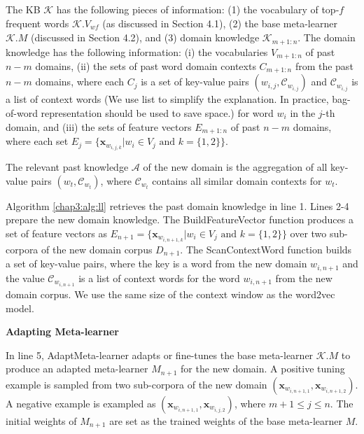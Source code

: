The KB $\mathcal{K}$ has the following pieces of information:
(1) the vocabulary of top-$f$ frequent words $\mathcal{K}.V_{\textit{wf}}$ (as discussed in Section 4.1), 
(2) the base meta-learner $\mathcal{K}.M$ (discussed in Section 4.2),
and (3) domain knowledge $\mathcal{K}_{m+1:n}$.
The domain knowledge has the following information:
(i) the vocabularies $V_{m+1:n}$ of past $n-m$ domains,
(ii) the sets of past word domain contexts $C_{m+1:n}$ from the past $n-m$ domains, where each $C_j$ is a set of key-value pairs $(w_{i,j}, \mathcal{C}_{w_{i,j} } )$ and $\mathcal{C}_{w_{i,j} } $ is a list of context words (We use list to simplify the explanation. In practice, bag-of-word representation should be used to save space.) for word $w_i$ in the $j$-th domain, 
and (iii) the sets of feature vectors $E_{m+1:n}$ of past $n-m$ domains, where each set $E_{j}=\{ \mathbf{x}_{w_{i, j, k}} | w_i \in V_{j} \text{ and } k=\{1, 2\} \}$.

The relevant past knowledge $\mathcal{A}$ of the new domain is the aggregation of all key-value pairs $(w_t, \mathcal{C}_{w_t})$, where $\mathcal{C}_{w_t}$ contains all similar domain contexts for $w_t$.

Algorithm \ref{chap3:alg:ll} retrieves the past domain knowledge in line 1.
Lines 2-4 prepare the new domain knowledge.
The BuildFeatureVector function produces a set of feature vectors as $E_{n+1}=\{ \mathbf{x}_{w_{i, n+1, k}} | w_i \in V_{j} \text{ and } k=\{1, 2\}\}$ over two sub-corpora of the new domain corpus $D_{n+1}$.
The ScanContextWord function builds a set of key-value pairs, where the key is a word from the new domain $w_{i, n+1}$ and the value $\mathcal{C}_{w_{i,n+1} } $ is a list of context words for the word $w_{i, n+1}$ from the new domain corpus. We use the same size of the context window as the word2vec model.

\textbf{Adapting Meta-learner}

In line 5, AdaptMeta-learner adapts or fine-tunes the base meta-learner $\mathcal{K}.M$ to produce an adapted meta-learner $M_{n+1}$ for the new domain.
A positive tuning example is sampled from two sub-corpora of the new domain $(\mathbf{x}_{w_{i, n+1, 1}}, \mathbf{x}_{w_{i, n+1, 2}})$.
A negative example is exampled as $(\mathbf{x}_{w_{i, n+1, 1}}, \mathbf{x}_{w_{i, j, 2}})$, where $m+1 \le j \le n$.
The initial weights of $M_{n+1}$ are set as the trained weights of the base meta-learner $M$. 

